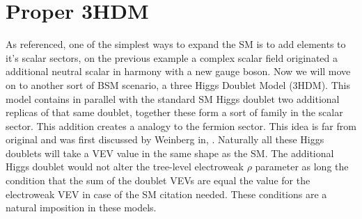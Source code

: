 
\newpage 

\chapter{Proper 3HDM}


% 
% 

As referenced, one of the simplest ways to expand the SM is to add elements to it's scalar sectors, on the previous example a complex scalar field originated a additional neutral scalar in harmony with a new gauge boson.
%
Now we will move on to another sort of BSM scenario, 
%
%
a three Higgs Doublet Model (3HDM). 
%
This model contains in parallel with the standard SM Higgs doublet two additional replicas of that same doublet, together these form a sort of family in the scalar sector. 
%
This addition creates a analogy to the fermion sector. This idea is far from original and was first discussed by Weinberg in, \cite{Weinberg1976}.
% 
Naturally all these Higgs doublets will take a VEV value in the same shape as the SM. 
%
The additional Higgs doublet would not alter the tree-level electroweak $\rho$ parameter as long the condition that the sum of the doublet VEVs are equal the value for the electroweak VEV in case of the SM {\color{blue} citation needed}. 
%
These conditions are a natural imposition in these models. 

